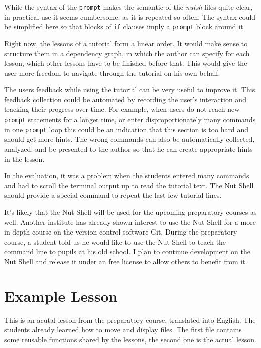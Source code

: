 \documentclass[paper=a4,twoside,abstract=on,cleardoublepage=empty,numbers=noenddot,toc=bib,12pt,appendixprefix=true]{scrreprt}
\begin{document}
While the syntax of the \texttt{prompt} makes the semantic of the \emph{nutsh} files quite clear, in practical use it seems cumbersome, as it is repeated so often. The syntax could be simplified here so that blocks of \texttt{if} clauses imply a \texttt{prompt} block around it.

Right now, the lessons of a tutorial form a linear order. It would make sense to structure them in a dependency graph, in which the author can specify for each lesson, which other lessons have to be finished before that. This would give the user more freedom to navigate through the tutorial on his own behalf.



The users feedback while using the tutorial can be very useful to improve it. This feedback collection could be automated by recording the user's interaction and tracking their progress over time. For example, when users do not reach new \texttt{prompt} statements for a longer time, or enter disproportionately many commands in one \texttt{prompt} loop this could be an indication that this section is too hard and should get more hints. The wrong commands can also be automatically collected, analyzed, and be presented to the author so that he can create appropriate hints in the lesson.

In the evaluation, it was a problem when the students entered many commands and had to scroll the terminal output up to read the tutorial text. The Nut Shell should provide a special command to repeat the last few tutorial lines.

It's likely that the Nut Shell will be used for the upcoming preparatory courses as well. Another institute has already shown interest to use the Nut Shell for a more in-depth course on the version control software Git. During the preparatory course, a student told us he would like to use the Nut Shell to teach the command line to pupils at his old school. I plan to continue development on the Nut Shell and release it under an free license to allow others to benefit from it.

\cleardoublepage
\appendix

\chapter{Example Lesson}
\label{sec:nutshexample}

This is an acutal lesson from the preparatory course, translated into English. The students already learned how to move and display files. The first file contains some reusable functions shared by the lessons, the second one is the actual lesson.
\end{document}
